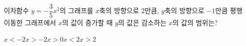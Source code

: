 이차함수 $y=-\dfrac{3}{5}x^2$의 그래프를 $x$축의 방향으로 $2$만큼, $y$축의 방향으로 $-1$만큼 평행이동한 그래프에서 $x$의 값이 증가할 때 $y$의 값은 감소하는 $x$의 값의 범위는?
\begin{choices32}{$x<-2$}{$x>-2$}{$x>0$}{$x<2$}{$x>2$}\end{choices32}
